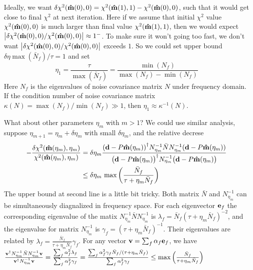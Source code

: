 \documentclass[11pt, letterpaper]{article}
\newcommand{\vbd}{\vb{d}}
\newcommand{\inv}[1]{#1^{-1}}
\newcommand{\hatm}{\vb{\hat{m}}}
\newcommand{\Nbar}{\bar{N}}
\begin{document}
Ideally, we want
$\delta \chi^2(\hatm(0),0) = \chi^2(\hatm(1), 1) - \chi^2(\hatm(0),0)$,
such that it would get close to final $\chi^2$ at next iteration.
Here if we assume that initial $\chi^2$ value $\chi^2(\hatm(0),0)$ is much
larger than final value $\chi^2(\hatm(1),1)$,
then we would expect
$\qty|\delta\chi^2(\hatm(0),0)/\chi^2(\hatm(0),0)| \approx 1^-$.
To make sure it won't going too fast, we don't want 
$\qty|\delta\chi^2(\hatm(0),0)/\chi^2(\hatm(0),0)|$ 
exceeds $1$.
So we could set upper bound $\delta \eta \max(\Nbar_f) / \tau = 1$
and set
\begin{equation}
\eta_1 = \frac{\tau}{\max(\Nbar_f)} = \frac{\min(N_f)}{\max(N_f) - \min(N_f)}
\end{equation}
Here $N_f$ is the eigenvalues of noise covariance matrix $N$ under frequency
domain.
If the condition number of noise covariance matrix
$\kappa(N) = \max(N_f)/\min(N_f) \gg 1$,
then $\eta_1 \approx \inv{\kappa} (N)$.

What about other parameters $\eta_m$ with $m > 1$?
We could use similar analysis,
suppose $\eta_{m+1} = \eta_m + \delta \eta_m$ with small $\delta\eta_m$,
and the relative decrese
\begin{align}
\begin{aligned}[b]
-\frac{\delta \chi^2(\hatm(\eta_m), \eta_m)}{\chi^2(\hatm(\eta_m), \eta_m)}  
&= \delta\eta_m
\frac{\qty(\vbd - P\hatm(\eta_m))^{\dagger}
    \inv{N_{\eta_m}} \Nbar \inv{N_{\eta_m}}
    (\vbd - P\hatm(\eta_m))
}
{\qty\big(\vbd - P \hatm(\eta_m))^{\dagger}
    \inv{N_{\eta_m}}
    \qty\big(\vbd - P\hatm(\eta_m))
}
\\
& \leq \delta \eta_m\, \max\qty(\frac{\Nbar_f}{\tau + \eta_m \Nbar_f})
\label{eta upper bound}
\end{aligned}
\end{align}
The upper bound at second line is a little bit tricky.
Both matrix $\Nbar$ and $\inv{N}_{\eta_m}$ 
can be simultaneously diagnalized in frequency space.
For each eigenvector $\vb{e}_f$
the corresponding eigenvalue of the matix 
$\inv{N}_{\eta_m} \Nbar \inv{N}_{\eta_m}$
is
$\lambda_f = \Nbar_f (\tau + \eta_m \Nbar_f)^{-2}$,
and the eigenvalue for matrix 
$\inv{N}_{\eta_m}$
is
$\gamma_f = (\tau + \eta_m \Nbar_f)^{-1}$.
Their eigenvalues are related by
$\lambda_f = \frac{\Nbar_f}{\tau + \eta_m \Nbar_f} \gamma_f$.
For any vector $\vb{v} = \sum_f \alpha_f \vb{e}_f$, we have
$\frac{\vb{v}^{\dagger} \inv{N}_{\eta_m} \Nbar \inv{N}_{\eta_m} \vb{v}}
{\vb{v}^{\dagger} \inv{N}_{\eta_m} \vb{v}}
= \frac{\sum_f \alpha_f^2 \lambda_f}{\sum_f \alpha_f^2 \gamma_f}
= \frac{\sum_f \alpha_f^2 \gamma_f \Nbar_f/(\tau + \eta_m \Nbar_f)}
{\sum_f \alpha_f^2 \gamma_f}
\leq \max \qty( \frac{\Nbar_f}{\tau + \eta_m \Nbar_f})
$
\end{document}

